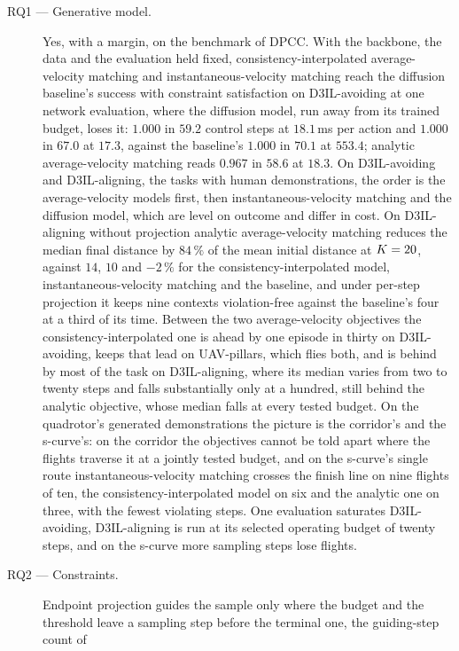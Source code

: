 \begin{description}
  \item[RQ1 --- Generative model.] Yes, with a margin, on the benchmark of \ac{DPCC}. With the
    backbone, the data and the evaluation held fixed, consistency-interpolated average-velocity
    matching and instantaneous-velocity matching reach the diffusion baseline's success with
    constraint satisfaction on D3IL-avoiding at one network evaluation, where the diffusion model,
    run away from its trained budget, loses it: $1.000$ in $59.2$ control steps at $18.1$\,ms per
    action and $1.000$ in $67.0$ at $17.3$, against the baseline's $1.000$ in $70.1$ at $553.4$;
    analytic average-velocity matching reads $0.967$ in $58.6$ at $18.3$. On D3IL-avoiding and
    D3IL-aligning, the tasks with human demonstrations, the order is the average-velocity models
    first, then instantaneous-velocity matching and the diffusion model, which are level on outcome
    and differ in cost. On D3IL-aligning without projection analytic average-velocity matching
    reduces the median final distance by $84\,\%$ of the mean initial distance at $K = 20$,
    against $14$, $10$ and $-2\,\%$ for the consistency-interpolated model, instantaneous-velocity
    matching and the baseline, and under per-step projection it keeps nine contexts violation-free
    against the baseline's four at a third of its time. Between the two average-velocity objectives
    the consistency-interpolated one is ahead by one episode in thirty on D3IL-avoiding, keeps that
    lead on UAV-pillars, which flies both, and is behind by most of the task on D3IL-aligning, where
    its median varies from two to twenty steps and falls substantially only at a hundred, still
    behind the analytic objective, whose median falls at every tested budget. On the quadrotor's
    generated demonstrations the picture is the corridor's and the s-curve's: on the corridor the
    objectives cannot be told apart where the flights traverse it at a jointly tested budget, and on
    the s-curve's single route instantaneous-velocity matching crosses the finish line on nine
    flights of ten, the consistency-interpolated model on six and the analytic one on three, with the
    fewest violating steps. One evaluation saturates D3IL-avoiding, D3IL-aligning is run at its
    selected operating budget of twenty steps, and on the s-curve more sampling steps lose flights.
  \item[RQ2 --- Constraints.] Endpoint projection guides the sample only where the budget and the
    threshold leave a sampling step before the terminal one, the guiding-step count of

\end{description}
